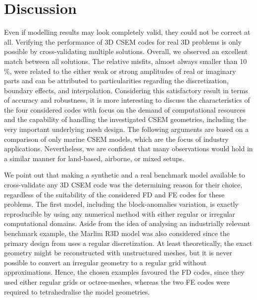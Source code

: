 \documentclass[
    paper,
  ]{geophysics}
\newcommand{\itodo}[1]{\todo[inline]{\sffamily #1}}
\begin{document}
\itodo{ADD cross section plots!}

\section{Discussion}
%
%
%
%

Even if modelling results may look completely valid, they could not be correct at all. Verifying the performance of 3D CSEM codes for real 3D problems is only possible by cross-validating multiple solutions. Overall, we observed an excellent match between all solutions. The relative misfits, almost always smaller than 10\,\%, were related to the either weak or strong amplitudes of real or imaginary parts and can be attributed to particularities regarding the discretization, boundary effects, and interpolation. Considering this satisfactory result in terms of accuracy and robustness, it is more interesting to discuss the characteristics of the four considered codes with focus on the demand of computational resources and the capability of handling the investigated CSEM geometries, including the very important underlying mesh design. The following arguments are based on a comparison of only marine CSEM models, which are the focus of industry applications. Nevertheless, we are confident that many observations would hold in a similar manner for land-based, airborne, or mixed setups.

We point out that making a synthetic and a real benchmark model available to cross-validate any 3D CSEM code was the determining reason for their choice, regardless of the suitability of the considered FD and FE codes for these problems. The first model, including the block-anomalies variation, is exactly reproducible by using any numerical method with either regular or irregular computational domains. Aside from the idea of analysing an industrially relevant benchmark example, the Marlim R3D model was also considered since the primary design from \cite{GEO.19.Correa} uses a regular discretization. At least theoretically, the exact geometry might be reconstructed with unstructured meshes, but it is never possible to convert an irregular geometry to a regular grid without approximations. Hence, the chosen examples favoured the FD codes, since they used either regular grids or octree-meshes, whereas the two FE codes were required to tetrahedralise the model geometries.
\end{document}
